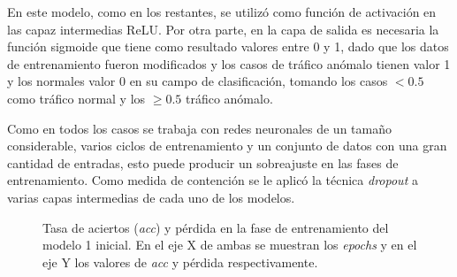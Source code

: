 En este modelo, como en los restantes, se utilizó como función de activación en las capaz intermedias ReLU. Por otra parte, en la capa de salida es necesaria la función sigmoide que tiene como resultado valores entre 0 y 1, dado que los datos de entrenamiento fueron modificados y los casos de tráfico anómalo tienen valor 1 y los normales valor 0 en su campo de clasificación, tomando los casos $< 0.5$ como tráfico normal y los $\geq 0.5$ tráfico anómalo.

Como en todos los casos se trabaja con redes neuronales de un tamaño considerable, varios ciclos de entrenamiento y un conjunto de datos con una gran cantidad de entradas, esto puede producir un sobreajuste en las fases de entrenamiento. Como medida de contención se le aplicó la técnica \textit{dropout} a varias capas intermedias de cada uno de los modelos.

\begin{figure}[!hb]
    \centering

    \caption{Tasa de aciertos (\textit{acc}) y pérdida en la fase de entrenamiento del modelo 1 inicial. En el eje X de ambas se muestran los \textit{epochs} y en el eje Y los valores de \textit{acc} y pérdida respectivamente.}
    \label{fig:4x5_train}
\end{figure}

